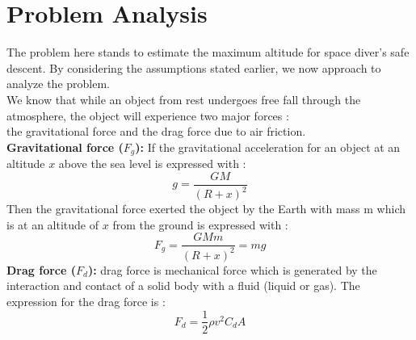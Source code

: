 \documentclass[a4paper, 14pt]{extarticle}
\begin{document}
\section{Problem Analysis}
The problem here stands to estimate the maximum altitude for space diver's safe descent. By considering the assumptions stated earlier, we now approach to analyze the problem.\\
We know that while an object from rest undergoes free fall through the atmosphere, the object will experience two major forces :\\ the gravitational force and the drag force due to air friction.\\
\textbf{Gravitational force ($F_g$):}
If the gravitational acceleration for an object at an altitude $x$ above the sea level is expressed with : $$g=\frac{GM}{(R+x)^2} $$
Then the gravitational force exerted the object by the Earth with mass m which is at an altitude of $x$ from the ground is expressed with :\\
$$F_g =\frac{GMm}{(R+x)^2}=mg$$ 
\textbf{Drag force ($F_d$):}
drag force is mechanical force which is generated by the interaction and contact of a solid body with a fluid (liquid or gas). The expression for the drag force is :
$$F_d = \frac{1}{2} \rho v^2 C_d A $$
\end{document}

